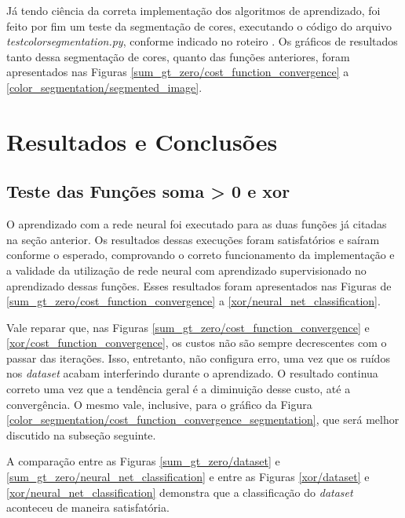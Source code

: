\documentclass[conference]{IEEEtran}
\begin{document}
Já tendo ciência da correta implementação dos algoritmos de aprendizado, foi feito por fim um teste da segmentação de cores, executando o código do arquivo \textit{test\underline{\space}color\underline{\space}segmentation.py}, conforme indicado no roteiro \cite{roteiro}. Os gráficos de resultados tanto dessa segmentação de cores, quanto das funções anteriores, foram apresentados nas Figuras \ref{sum_gt_zero/cost_function_convergence} a \ref{color_segmentation/segmented_image}.

\section{Resultados e Conclusões}

\subsection{Teste das Funções soma > 0 e xor}

O aprendizado com a rede neural foi executado para as duas funções já citadas na seção anterior. Os resultados dessas execuções foram satisfatórios e saíram conforme o esperado, comprovando o correto funcionamento da implementação e a validade da utilização de rede neural com aprendizado supervisionado no aprendizado dessas funções. Esses resultados foram apresentados nas Figuras de \ref{sum_gt_zero/cost_function_convergence} a \ref{xor/neural_net_classification}.

Vale reparar que, nas Figuras \ref{sum_gt_zero/cost_function_convergence} e \ref{xor/cost_function_convergence}, os custos não são sempre decrescentes com o passar das iterações. Isso, entretanto, não configura erro, uma vez que os ruídos nos \textit{dataset} acabam interferindo durante o aprendizado. O resultado continua correto uma vez que a tendência geral é a diminuição desse custo, até a convergência. O mesmo vale, inclusive, para o gráfico da Figura \ref{color_segmentation/cost_function_convergence_segmentation}, que será melhor discutido na subseção seguinte.

A comparação entre as Figuras \ref{sum_gt_zero/dataset} e \ref{sum_gt_zero/neural_net_classification} e entre as Figuras \ref{xor/dataset} e \ref{xor/neural_net_classification} demonstra que a classificação do \textit{dataset} aconteceu de maneira satisfatória.
\end{document}
